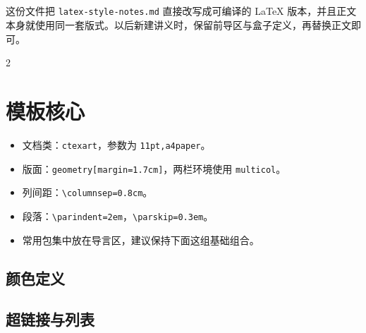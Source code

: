 \documentclass[11pt,a4paper]{ctexart}
\title{\bfseries\color{accent}{LaTeX 讲义格式速记}\\[3pt]
\large\color{softgray}{复现本次版式}}
\author{}
\date{\color{softgray}{\today}}
\begin{document}
\maketitle

\begin{abstractbox}
这份文件把 \texttt{latex-style-notes.md} 直接改写成可编译的 LaTeX 版本，并且正文本身就使用同一套版式。以后新建讲义时，保留前导区与盒子定义，再替换正文即可。
\end{abstractbox}

\begin{multicols}{2}

\section{模板核心}

\begin{itemize}
\item 文档类：\texttt{ctexart}，参数为 \texttt{11pt,a4paper}。
\item 版面：\texttt{geometry[margin=1.7cm]}，两栏环境使用 \texttt{multicol}。
\item 列间距：\texttt{\textbackslash columnsep=0.8cm}。
\item 段落：\texttt{\textbackslash parindent=2em}，\texttt{\textbackslash parskip=0.3em}。
\item 常用包集中放在导言区，建议保持下面这组基础组合。
\end{itemize}

\begin{codeblock}
\usepackage{amsmath,amssymb,amsthm,mathtools,bm}
\usepackage{enumitem}
\usepackage{hyperref}
\usepackage{multicol}
\usepackage[most]{tcolorbox}
\usepackage{tikz}
\usepackage{microtype}
\usepackage{titlesec}
\usepackage{cleveref}
\end{codeblock}

\subsection{颜色定义}

\begin{codeblock}
\end{codeblock}

\subsection{超链接与列表}


\end{multicols}
\end{document}
